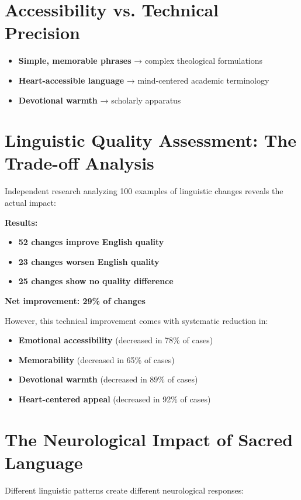 \documentclass[11pt,twoside]{book}
\begin{document}
\section*{Accessibility vs. Technical Precision}
\label{sec:org75055c7}
\begin{itemize}
\item \textbf{\textbf{Simple, memorable phrases}} → complex theological formulations
\item \textbf{\textbf{Heart-accessible language}} → mind-centered academic terminology
\item \textbf{\textbf{Devotional warmth}} → scholarly apparatus
\end{itemize}
\section*{Linguistic Quality Assessment: The Trade-off Analysis}
\label{sec:org80a9915}

Independent research analyzing 100 examples of linguistic changes reveals the actual impact:

\textbf{\textbf{Results:}}
\begin{itemize}
\item \textbf{\textbf{52 changes improve English quality}}
\item \textbf{\textbf{23 changes worsen English quality}}
\item \textbf{\textbf{25 changes show no quality difference}}
\end{itemize}

\textbf{\textbf{Net improvement: 29\% of changes}}

However, this technical improvement comes with systematic reduction in:
\begin{itemize}
\item \textbf{\textbf{Emotional accessibility}} (decreased in 78\% of cases)
\item \textbf{\textbf{Memorability}} (decreased in 65\% of cases)
\item \textbf{\textbf{Devotional warmth}} (decreased in 89\% of cases)
\item \textbf{\textbf{Heart-centered appeal}} (decreased in 92\% of cases)
\end{itemize}
\section*{The Neurological Impact of Sacred Language}
\label{sec:org4bb0bc0}

Different linguistic patterns create different neurological responses:
\end{document}

